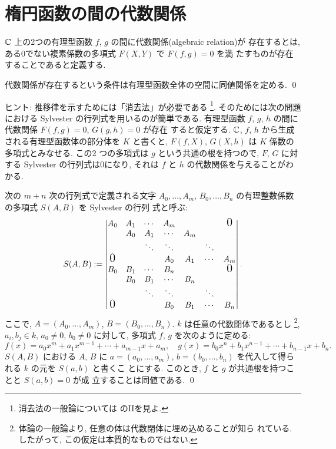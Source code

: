 \documentclass[12pt,twoside]{jarticle}
\def\Zero{{\text{\Large 0}}}
\def\C{{\Bbb C}} %
\begin{document}

\section{楕円函数の間の代数関係}

$\C$ 上の2つの有理型函数 $f$, $g$ の間に代数関係(algebraic relation)が
存在するとは, ある0でない複素係数の多項式 $F(X,Y)$ で $F(f,g)=0$ を満
たすものが存在することであると定義する.

\begin{question}\label{q:alg-rel-equiv}
  代数関係が存在するという条件は有理型函数全体の空間に同値関係を定める. 
  \qed
\end{question}

\noindent ヒント: 推移律を示すためには「消去法」が必要である%
\footnote{消去法の一般論については \cite{vdW}のIIを見よ.}. %
そのためには次の問題における Sylvester の行列式を用いるのが簡単である.
有理型函数 $f$, $g$, $h$ の間に代数関係 $F(f,g)=0$, $G(g,h)=0$ が存在
すると仮定する. $\C$, $f$, $h$ から生成される有理型函数体の部分体を 
$K$ と書くと, $F(f,X)$, $G(X,h)$ は $K$ 係数の多項式とみなせる. この2
つの多項式は $g$ という共通の根を持つので, $F$, $G$ に対する Sylvester 
の行列式は0になり, それは $f$ と $h$ の代数関係を与えることがわかる.

\begin{question}[Sylvesterの行列式]
  次の $m+n$ 次の行列式で定義される文字 $A_0,\dots,A_m$, %
  $B_0,\dots,B_n$ の有理整数係数の多項式 $S(A,B)$ を Sylvester の行列
  式と呼ぶ:
  \[
    S(A,B):=
    \begin{vmatrix}
      A_0   & A_1 & \cdots & A_m    &     &        & \Zero \\
            & A_0 & A_1    & \cdots & A_m &        & \\
            &     & \ddots & \ddots &     & \ddots & \\
      \Zero &     &        & A_0    & A_1 & \cdots & A_m \\
      B_0   & B_1 & \cdots & B_n    &     &        & \Zero \\
            & B_0 & B_1    & \cdots & B_n &        & \\
            &     & \ddots & \ddots &     & \ddots & \\
      \Zero &     &        & B_0    & B_1 & \cdots & B_n \\
    \end{vmatrix}.
  \] %
  ここで, $A=(A_0,\dots,A_m)$, $B=(B_0,\dots,B_n)$. 
  $k$ は任意の代数閉体であるとし%
  \footnote{体論の一般論より, 任意の体は代数閉体に埋め込めることが知ら
    れている. したがって, この仮定は本質的なものではない.}, %
  $a_i,b_j\in k$, $a_0\ne0$, $b_0\ne0$ に対して, 
  多項式 $f$, $g$ を次のように定める:
  \[
    f(x)=a_0x^m+a_1x^{m-1}+\cdots+a_{m-1}x+a_m,
    \quad
    g(x)=b_0x^n+b_1x^{n-1}+\cdots+b_{n-1}x+b_n.
  \] %
  $S(A,B)$ における $A$, $B$ に $a=(a_0,\dots,a_m)$, %
  $b=(b_0,\dots,b_n)$ を代入して得られる $k$ の元を $S(a,b)$ と書くこ
  とにする. このとき, $f$ と $g$ が共通根を持つことと $S(a,b)=0$ が成
  立することは同値である. \qed
\end{question}
\end{document}
